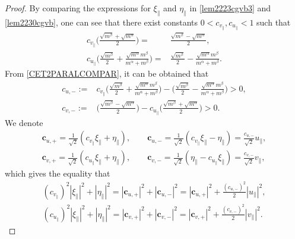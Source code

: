 \documentclass[reqno]{amsart}
\numberwithin{equation}{section}
\numberwithin{equation}{section}
\begin{document}
\begin{proof}
		By comparing the expressions for $\xi_{\parallel}$ and $\eta_{\parallel}$ in \eqref{lem2223cgvb3} and \eqref{lem2230cgvb}, one can see that there exist constants $0<c_{v_\parallel},c_{u_\parallel}<1$ such that
		\begin{equation}
			\begin{split}
				c_{v_\parallel}\big(\frac{\sqrt{m^\beta}+\sqrt{m^\alpha}}{2}\big)=&\frac{\sqrt{m^\beta}-\sqrt{m^\alpha}}{2},\\
				c_{u_\parallel}\big(\frac{\sqrt{m^\beta}}{2}+\frac{\sqrt{m^{\alpha}}m^{\beta}}{m^{\alpha}+m^{\beta}}\big)=&\frac{\sqrt{m^\beta}}{2}-\frac{\sqrt{m^{\alpha}}m^{\beta}}{m^{\alpha}+m^{\beta}}.
			\end{split}
		\end{equation}
		From \eqref{CET2PARALCOMPAR}, it can be obtained that
		\begin{equation*}
			\begin{split}
				c_{u,-}:=&c_{v_\parallel}\big(\frac{\sqrt{m^\beta}}{2}+\frac{\sqrt{m^{\alpha}}m^{\beta}}{m^{\alpha}+m^{\beta}}\big)-\big(\frac{\sqrt{m^\beta}}{2}-\frac{\sqrt{m^{\alpha}}m^{\beta}}{m^{\alpha}+m^{\beta}}\big)>0,\\
				c_{v,-}:=&\big(\frac{\sqrt{m^\beta}-\sqrt{m^\alpha}}{2}\big)-c_{u_\parallel}\big(\frac{\sqrt{m^\beta}+\sqrt{m^\alpha}}{2}\big)>0.
			\end{split}
		\end{equation*}
		We denote
		\begin{equation*}
			\begin{split}
				\mathbf{c}_{u,+}=\frac{1}{\sqrt{2}}(c_{v_\parallel}\xi_{\parallel}+\eta_{\parallel}), \qquad \mathbf{c}_{u,-}=\frac{1}{\sqrt{2}}(c_{v_\parallel}\xi_{\parallel}-\eta_{\parallel})=\frac{c_{u,-}}{\sqrt{2}}u_{\parallel},\\
				\mathbf{c}_{v,+}=\frac{1}{\sqrt{2}}(c_{u_\parallel}\xi_{\parallel}+\eta_{\parallel}), \qquad \mathbf{c}_{v,-}=\frac{1}{\sqrt{2}}(\eta_{\parallel}-c_{u_\parallel}\xi_{\parallel})=\frac{c_{v,-}}{\sqrt{2}}v_{\parallel},
			\end{split}
		\end{equation*}
		which gives the equality that
		\begin{equation*}
			\begin{split}
				(c_{v_\parallel})^2|\xi_{\parallel}|^2+|\eta_{\parallel}|^2= |\mathbf{c}_{u,+}|^2+|\mathbf{c}_{u,-}|^2=|\mathbf{c}_{u,+}|^2+\frac{(c_{u,-})^2}{2}|u_{\parallel}|^2,\\
				(c_{u_\parallel})^2|\xi_{\parallel}|^2+|\eta_{\parallel}|^2= |\mathbf{c}_{v,+}|^2+|\mathbf{c}_{v,-}|^2=|\mathbf{c}_{v,+}|^2+\frac{(c_{v,-})^2}{2}|v_{\parallel}|^2.

\end{split}
\end{equation*}
\end{proof}
\end{document}
